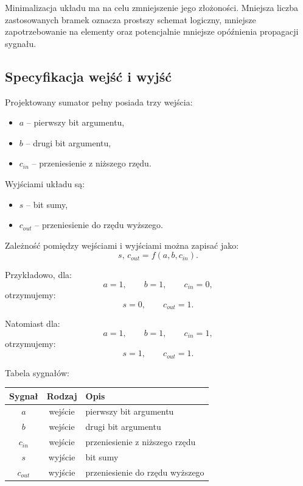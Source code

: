Minimalizacja układu ma na celu zmniejszenie jego złożoności. Mniejsza liczba zastosowanych bramek oznacza prostszy schemat logiczny, mniejsze zapotrzebowanie na elementy oraz potencjalnie mniejsze opóźnienia propagacji sygnału.

\subsection{Specyfikacja wejść i wyjść}

Projektowany sumator pełny posiada trzy wejścia:
\begin{itemize}
    \item $a$ -- pierwszy bit argumentu,
    \item $b$ -- drugi bit argumentu,
    \item $c_{in}$ -- przeniesienie z niższego rzędu.
\end{itemize}

Wyjściami układu są:
\begin{itemize}
    \item $s$ -- bit sumy,
    \item $c_{out}$ -- przeniesienie do rzędu wyższego.
\end{itemize}

Zależność pomiędzy wejściami i wyjściami można zapisać jako:
\begin{equation*}
s, \, c_{out} = f(a, b, c_{in}).
\end{equation*}

Przykładowo, dla:
\begin{equation*}
a = 1, \qquad b = 1, \qquad c_{in} = 0,
\end{equation*}
otrzymujemy:
\begin{equation*}
s = 0, \qquad c_{out} = 1.
\end{equation*}

Natomiast dla:
\begin{equation*}
a = 1, \qquad b = 1, \qquad c_{in} = 1,
\end{equation*}
otrzymujemy:
\begin{equation*}
s = 1, \qquad c_{out} = 1.
\end{equation*}

\vspace{0.5em}
\noindent Tabela sygnałów:

\begin{center}
\begin{tabular}{|c|c|l|}
\hline
\textbf{Sygnał} & \textbf{Rodzaj} & \textbf{Opis} \\
\hline
$a$       & wejście & pierwszy bit argumentu \\
$b$       & wejście & drugi bit argumentu \\
$c_{in}$  & wejście & przeniesienie z niższego rzędu \\
$s$       & wyjście & bit sumy \\
$c_{out}$ & wyjście & przeniesienie do rzędu wyższego \\
\hline
\end{tabular}
\end{center}

